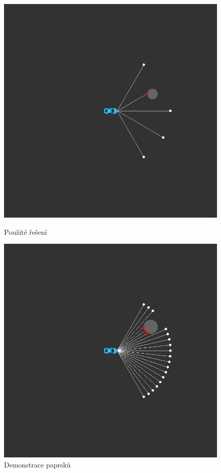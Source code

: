 \documentclass[a4paper,12pt]{article}
\begin{document}
            \vspace{1em}
            \begin{figure}[H]
            \centering
            \begin{minipage}[t]{.5\textwidth}
                \centering
                \includegraphics[trim = 5cm 5cm 5cm 5cm, clip, width=0.9\linewidth]{data/rays1.png}
                \caption*{Použité řešení}
            \end{minipage}%
            \begin{minipage}[t]{.5\textwidth}
                \centering
                \includegraphics[trim = 5cm 5cm 5cm 5cm, clip, width=0.9\linewidth]{data/rays2.png}
                \caption*{Demonstrace paprsků}
            \end{minipage}
            \label{fig:rays}
            \end{figure}
            \pagebreak
\end{document}
